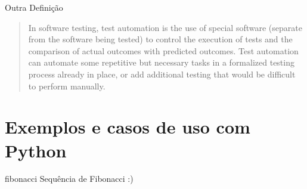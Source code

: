 \documentclass[]{beamer}
\begin{document}
  \begin{frame}{Outra Definição}
\blockquote[{\cite[Wikipedia]{_test_2014}}]{
In software testing, test automation is the use of special software (separate
from the software being tested) to control the execution of tests and the
comparison of actual outcomes with predicted outcomes. Test automation can
automate some repetitive but necessary tasks in a formalized testing process
already in place, or add additional testing that would be difficult to perform
manually.
}
  \end{frame}

  \section{Exemplos e casos de uso com Python}

  \begin{frame}{fibonacci}
    Sequência de Fibonacci :)
  \end{frame}

  
  
\end{document}
